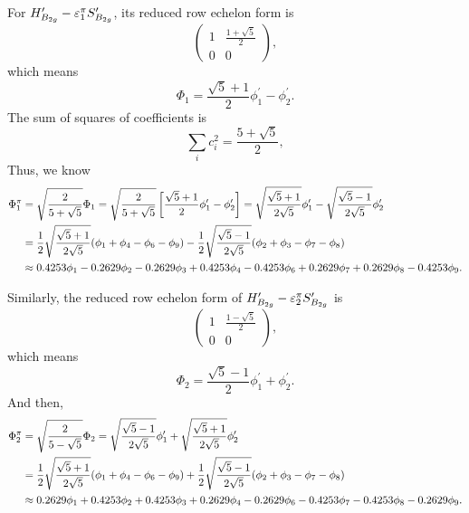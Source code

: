 		For $H^\prime_{B_{2g}}-\varepsilon^\pi_1 S^\prime_{B_{2g}}$, its reduced row echelon form is
		\begin{equation*}
			\begin{pmatrix}
				1	& \frac{1+\sqrt{5}}{2}	\\	0	&	0
			\end{pmatrix},
		\end{equation*}
		which means
		\begin{equation*}
			\Phi_1 = \frac{\sqrt{5}+1}{2}\phi^\prime_1 - \phi^\prime_2.
		\end{equation*}
		The sum of squares of coefficients is
		\begin{equation*}
			\sum_{i} c^2_i = \frac{ 5+\sqrt{5} }{2},
		\end{equation*}
		Thus, we know
		\begin{align}
			\Phi^\pi_1 &= \sqrt{ \frac{2}{5+\sqrt{5}} } \Phi_1 = \sqrt{ \frac{2}{5+\sqrt{5}} } \left[ \frac{\sqrt{5}+1}{2}\phi^\prime_1 - \phi^\prime_2 \right] = \sqrt{\frac{\sqrt{5}+1}{2\sqrt{5}}} \phi^\prime_1 - \sqrt{\frac{\sqrt{5}-1}{2\sqrt{5}}} \phi^\prime_2	\notag \\
			&= \frac{1}{2}\sqrt{\frac{\sqrt{5}+1}{2\sqrt{5}}} (\phi_1 + \phi_4 - \phi_6 - \phi_9) - \frac 12 \sqrt{\frac{\sqrt{5}-1}{2\sqrt{5}}} (\phi_2 + \phi_3 - \phi_7 - \phi_8)\notag \\
			&\approx 0.4253 \phi_1 - 0.2629 \phi_2 - 0.2629 \phi_3 + 0.4253 \phi_4 - 0.4253\phi_6 + 0.2629\phi_7 + 0.2629\phi_8 - 0.4253 \phi_9.
		\end{align}
		
		Similarly, the reduced row echelon form of $H^\prime_{B_{2g}}-\varepsilon^\pi_2 S^\prime_{B_{2g}}$ is
		\begin{equation*}
			\begin{pmatrix}
				1	& \frac{1-\sqrt{5}}{2}	\\	0	&	0
			\end{pmatrix},
		\end{equation*}		
		which means
		\begin{equation*}
			\Phi_2 = \frac{\sqrt{5}-1}{2}\phi^\prime_1 + \phi^\prime_2.
		\end{equation*}
		And then,
		\begin{align}
			\Phi^\pi_2 &= \sqrt{ \frac{2}{5-\sqrt{5}} } \Phi_2 = \sqrt{\frac{\sqrt{5}-1}{2\sqrt{5}}} \phi^\prime_1 + \sqrt{\frac{\sqrt{5}+1}{2\sqrt{5}}} \phi^\prime_2	\notag \\
			&= \frac{1}{2}\sqrt{\frac{\sqrt{5}+1}{2\sqrt{5}}}(\phi_1 + \phi_4 - \phi_6 - \phi_9) + \frac{1}{2}\sqrt{\frac{\sqrt{5}-1}{2\sqrt{5}}} (\phi_2 + \phi_3 - \phi_7 - \phi_8) \notag \\
			&\approx 0.2629 \phi_1 + 0.4253 \phi_2 + 0.4253 \phi_3 + 0.2629 \phi_4 - 0.2629\phi_6 - 0.4253 \phi_7 - 0.4253 \phi_8 - 0.2629 \phi_9.
		\end{align}


